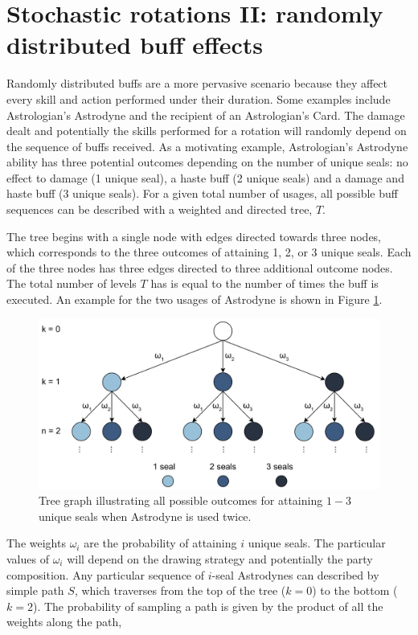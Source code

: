\documentclass{article}
\begin{document}
    \section{Stochastic rotations II: randomly distributed buff effects}
    Randomly distributed buffs are a more pervasive scenario because they affect every skill and action performed under their duration. Some examples include Astrologian's Astrodyne and the recipient of an Astrologian's Card. The damage dealt and potentially the skills performed for a rotation will randomly depend on the sequence of buffs received. As a motivating example, Astrologian's Astrodyne ability has three potential outcomes depending on the number of unique seals: no effect to damage (1 unique seal), a haste buff (2 unique seals) and a damage and haste buff (3 unique seals). For a given total number of usages, all possible buff sequences can be described with a weighted and directed tree, $T$. 
    
    The tree begins with a single node with edges directed towards three nodes, which corresponds to the three outcomes of attaining 1, 2, or 3 unique seals. Each of the three nodes has three edges directed to three additional outcome nodes. The total number of levels $T$ has is equal to the number of times the buff is executed. An example for the two usages of Astrodyne is shown in Figure \ref{fig:rotation-tree}.

    \begin{figure}[H]
        \centering
        \includegraphics[width=0.9\linewidth]{img/rotation-tree.png}
        \caption{Tree graph illustrating all possible outcomes for attaining $1 - 3$ unique seals when Astrodyne is used twice.}\label{fig:rotation-tree}
    \end{figure}

    The weights $\omega_i$ are the probability of attaining $i$ unique seals. The particular values of $\omega_i$ will depend on the drawing strategy and potentially the party composition. Any particular sequence of $i$-seal Astrodynes can described by simple path $S$, which traverses from the top of the tree ($k=0$) to the bottom ($k=2$). The probability of sampling a path is given by the product of all the weights along the path,
\end{document}
